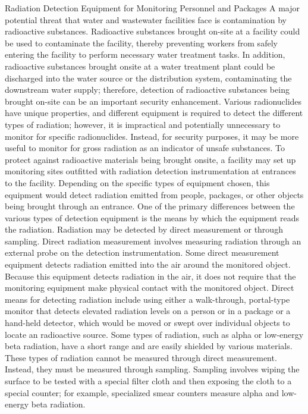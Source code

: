 \documentclass{article}
\begin{document}
Radiation Detection Equipment for Monitoring Personnel and Packages A
major potential threat that water and wastewater facilities face is
contamination by radioactive substances. Radioactive substances brought
on-site at a facility could be used to contaminate the facility, thereby
preventing workers from safely entering the facility to perform
necessary water treatment tasks. In addition, radioactive substances
brought onsite at a water treatment plant could be discharged into the
water source or the distribution system, contaminating the downstream
water supply; therefore, detection of radioactive substances being
brought on-site can be an important security enhancement. Various
radionuclides have unique properties, and different equipment is
required to detect the different types of radiation; however, it is
impractical and potentially unnecessary to monitor for specific
radionuclides. Instead, for security purposes, it may be more useful to
monitor for gross radiation as an indicator of unsafe substances. To
protect against radioactive materials being brought onsite, a facility
may set up monitoring sites outfitted with radiation detection
instrumentation at entrances to the facility. Depending on the specific
types of equipment chosen, this equipment would detect radiation emitted
from people, packages, or other objects being brought through an
entrance. One of the primary differences between the various types of
detection equipment is the means by which the equipment reads the
radiation. Radiation may be detected by direct measurement or through
sampling. Direct radiation measurement involves measuring radiation
through an external probe on the detection instrumentation. Some direct
measurement equipment detects radiation emitted into the air around the
monitored object. Because this equipment detects radiation in the air,
it does not require that the monitoring equipment make physical contact
with the monitored object. Direct means for detecting radiation include
using either a walk-through, portal-type monitor that detects elevated
radiation levels on a person or in a package or a hand-held detector,
which would be moved or swept over individual objects to locate an
radioactive source. Some types of radiation, such as alpha or low-energy
beta radiation, have a short range and are easily shielded by various
materials. These types of radiation cannot be measured through direct
measurement. Instead, they must be measured through sampling. Sampling
involves wiping the surface to be tested with a special filter cloth and
then exposing the cloth to a special counter; for example, specialized
smear counters measure alpha and low-energy beta radiation.
\end{document}

